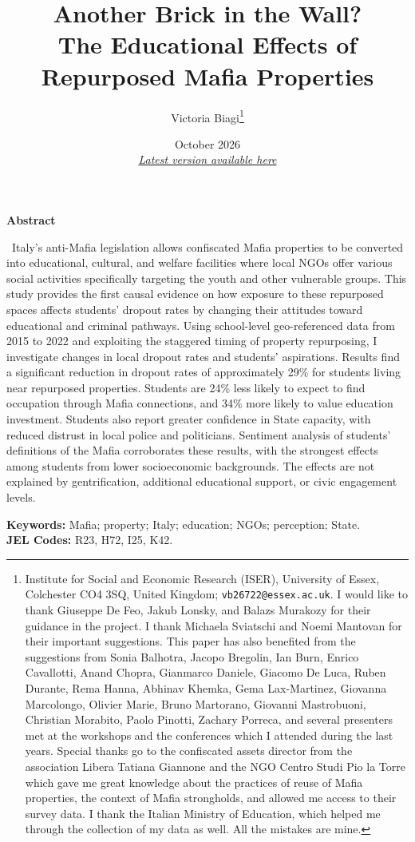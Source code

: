 \documentclass[12pt]{article}
\title{\normalfont \Large Another Brick in the Wall? \\ The Educational Effects of Repurposed Mafia Properties}
\author{Victoria Biagi\small{\thanks{Institute for Social and Economic Research (ISER), University of Essex, Colchester CO4 3SQ, United Kingdom; \texttt{vb26722@essex.ac.uk}. I would like to thank Giuseppe De Feo, Jakub Lonsky, and Balazs Murakozy for their guidance in the project. I thank Michaela Sviatschi and Noemi Mantovan for their important suggestions. This paper has also benefited from the suggestions from Sonia Balhotra, Jacopo Bregolin, Ian Burn, Enrico Cavallotti, Anand Chopra, Gianmarco Daniele, Giacomo De Luca, Ruben Durante, Rema Hanna, Abhinav Khemka, Gema Lax-Martinez, Giovanna Marcolongo, Olivier Marie, Bruno Martorano, Giovanni Mastrobuoni, Christian Morabito, Paolo Pinotti, Zachary Porreca, and several presenters met at the workshops and the conferences which I attended during the last years. Special thanks go to the confiscated assets director from the association Libera Tatiana Giannone and the NGO Centro Studi Pio la Torre which gave me great knowledge about the practices of reuse of Mafia properties, the context of Mafia strongholds, and allowed me access to their survey data. I thank the Italian Ministry of Education, which helped me through the collection of my data as well. All the mistakes are mine.}}}
\date{October 2026 \\[0.3cm]
{\small \href{https://github.com/victoriabiagi/JMP/raw/main/draft_0926.pdf}{\emph{Latest version available here}}}}
\theoremstyle{plain}
\theoremstyle{plain}
\theoremstyle{plain}
\theoremstyle{definition}
\theoremstyle{plain}
\theoremstyle{definition}
\theoremstyle{plain}
\theoremstyle{remark}
\theoremstyle{definition}
\theoremstyle{definition}
\theoremstyle{plain}
\begin{document}
      
\maketitle
\justifying
\vspace{-0.5cm}
 \begin{center}
    \textbf{\large{ \small{Abstract}}} \\ 
 \end{center}
 \vspace{-0.2cm}
  \small{
 Italy's anti-Mafia legislation allows confiscated Mafia properties to be converted into educational, cultural, and welfare facilities where local NGOs offer various social activities specifically targeting the youth and other vulnerable groups. This study provides the first causal evidence on how exposure to these repurposed spaces affects students' dropout rates by changing their attitudes toward educational and criminal pathways. Using school-level geo-referenced data from 2015 to 2022 and exploiting the staggered timing of property repurposing, I investigate changes in local dropout rates and students' aspirations. Results find a significant reduction in dropout rates of approximately 29\% for students living near repurposed properties. Students are 24\% less likely to expect to find occupation through Mafia connections, and 34\% more likely to value education investment.
 Students also report greater confidence in State capacity, with reduced distrust in local police and politicians. Sentiment analysis of students' definitions of the Mafia corroborates these results, with the strongest effects among students from lower socioeconomic backgrounds. The effects are not explained by gentrification, additional educational support, or civic engagement levels. } \par


\vspace{0.1cm}
\noindent\small{
\textbf{Keywords:} Mafia; property; Italy; education;  NGOs; perception; State. \\
\textbf{JEL Codes:} R23, H72, I25, K42. }
\newpage
\titleformat{\section}{\normalfont\Large\bfseries}{\thesection}{1em}{}
\titleformat{\subsection}{\normalfont\large\bfseries}{\thesubsection}{1em}{}
\titleformat{\subsubsection}{\normalfont\normalsize\bfseries}{\thesubsubsection}{1em}{}
\end{document}
